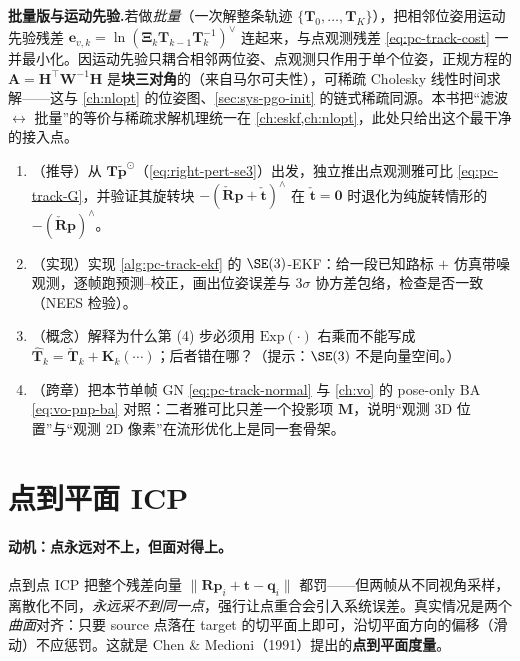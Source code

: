 \begin{note}
\textbf{批量版与运动先验.}\;若做\emph{批量}（一次解整条轨迹 $\{\mathbf{T}_0,\dots,\mathbf{T}_K\}$），把相邻位姿用运动先验残差 $\mathbf{e}_{v,k}=\ln(\boldsymbol{\Xi}_k\mathbf{T}_{k-1}\mathbf{T}_k^{-1})^\vee$ 连起来，与点观测残差 \cref{eq:pc-track-cost} 一并最小化。因运动先验只耦合相邻两位姿、点观测只作用于单个位姿，正规方程的 $\mathbf{A}=\mathbf{H}^\top\mathbf{W}^{-1}\mathbf{H}$ 是\textbf{块三对角}的（来自马尔可夫性），可稀疏 Cholesky 线性时间求解——这与 \cref{ch:nlopt} 的位姿图、\cref{sec:sys-pgo-init} 的链式稀疏同源。本书把“滤波 $\leftrightarrow$ 批量”的等价与稀疏求解机理统一在 \cref{ch:eskf,ch:nlopt}，此处只给出这个最干净的接入点。
\end{note}

\begin{practice}
\begin{enumerate}
  \item （推导）从 $\mathbf{T}\tilde{\mathbf{p}}^{\odot}$（\cref{eq:right-pert-se3}）出发，独立推出点观测雅可比 \cref{eq:pc-track-G}，并验证其旋转块 $-(\check{\mathbf{R}}\mathbf{p}+\check{\mathbf{t}})^\wedge$ 在 $\check{\mathbf{t}}=\mathbf{0}$ 时退化为纯旋转情形的 $-(\check{\mathbf{R}}\mathbf{p})^\wedge$。
  \item （实现）实现 \cref{alg:pc-track-ekf} 的 $\SE(3)$-EKF：给一段已知路标 $+$ 仿真带噪观测，逐帧跑预测--校正，画出位姿误差与 $3\sigma$ 协方差包络，检查是否一致（NEES 检验）。
  \item （概念）解释为什么第 (4) 步必须用 $\mathrm{Exp}(\cdot)$ 右乘而不能写成 $\hat{\mathbf{T}}_k=\check{\mathbf{T}}_k+\mathbf{K}_k(\cdots)$；后者错在哪？（提示：$\SE(3)$ 不是向量空间。）
  \item （跨章）把本节单帧 GN \cref{eq:pc-track-normal} 与 \cref{ch:vo} 的 pose-only BA \cref{eq:vo-pnp-ba} 对照：二者雅可比只差一个投影项 $\mathbf{M}$，说明“观测 3D 位置”与“观测 2D 像素”在流形优化上是同一套骨架。
\end{enumerate}
\end{practice}

\section{点到平面 ICP}
\label{sec:pc-p2plane}

\paragraph{动机：点永远对不上，但面对得上。}
点到点 ICP 把整个残差向量 $\|\mathbf{R}\mathbf{p}_i+\mathbf{t}-\mathbf{q}_i\|$ 都罚——但两帧从不同视角采样，离散化不同，\emph{永远采不到同一点}，强行让点重合会引入系统误差。真实情况是两个\emph{曲面}对齐：只要 source 点落在 target 的切平面上即可，沿切平面方向的偏移（滑动）不应惩罚。这就是 Chen \& Medioni（1991）提出的\textbf{点到平面度量}\cite{chen1992pointplane}。

